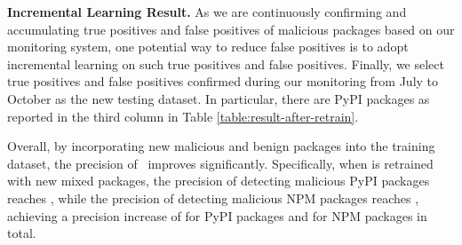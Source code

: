 \textbf{Incremental Learning Result.} As we are continuously confirming and accumulating true positives and false positives of malicious packages based on our monitoring system, one potential way to reduce false positives is to adopt incremental learning on such true positives and false positives.    Finally, we select true positives and false positives confirmed during our monitoring from July to October as the new testing dataset. In particular, there are  PyPI packages  as reported in the third column in Table \ref{table:result-after-retrain}. 

Overall, by incorporating new malicious and benign packages into the training dataset, the precision of \tool~improves significantly. Specifically, when \tool is retrained with new mixed packages, the precision of detecting malicious PyPI packages reaches , while the precision of detecting malicious NPM packages reaches , achieving a precision increase of  for PyPI packages and  for NPM packages in total.




